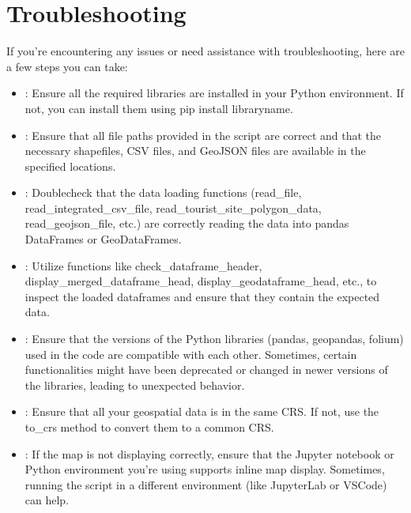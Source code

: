 \documentclass[letterpaper,10pt,english]{sphinxmanual}
\begin{document}
\section{Troubleshooting}
\label{\detokenize{egm722_serenee/NI_Tourist_Map_doc:troubleshooting}}
\sphinxAtStartPar
If you’re encountering any issues or need assistance with troubleshooting, here are a few steps you can take:
\begin{itemize}
\item {} 
\sphinxAtStartPar
{}: Ensure all the required libraries are installed in your Python environment. If not, you can install them using pip install library\sphinxhyphen{}name.

\item {} 
\sphinxAtStartPar
{}: Ensure that all file paths provided in the script are correct and that the necessary shapefiles, CSV files, and GeoJSON files are available in the specified locations.

\item {} 
\sphinxAtStartPar
{}: Double\sphinxhyphen{}check that the data loading functions (read\_file, read\_integrated\_csv\_file, read\_tourist\_site\_polygon\_data, read\_geojson\_file, etc.) are correctly reading the data into pandas DataFrames or GeoDataFrames.

\item {} 
\sphinxAtStartPar
{}: Utilize functions like check\_dataframe\_header, display\_merged\_dataframe\_head, display\_geodataframe\_head, etc., to inspect the loaded dataframes and ensure that they contain the expected data.

\item {} 
\sphinxAtStartPar
{}: Ensure that the versions of the Python libraries (pandas, geopandas, folium) used in the code are compatible with each other. Sometimes, certain functionalities might have been deprecated or changed in newer versions of the libraries, leading to unexpected behavior.

\item {} 
\sphinxAtStartPar
{}: Ensure that all your geospatial data is in the same CRS. If not, use the to\_crs method to convert them to a common CRS.

\item {} 
\sphinxAtStartPar
{}: If the map is not displaying correctly, ensure that the Jupyter notebook or Python environment you’re using supports inline map display. Sometimes, running the script in a different environment (like JupyterLab or VSCode) can help.


\end{itemize}
\end{document}
